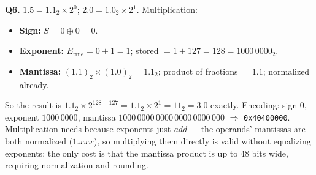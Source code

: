 \documentclass[11pt]{article}
\begin{document}
\textbf{Q6.} $1.5 = 1.1_2 \times 2^0$; $2.0 = 1.0_2 \times 2^1$. Multiplication:
\begin{itemize}
  \item \textbf{Sign:} $S = 0 \oplus 0 = 0$.
  \item \textbf{Exponent:} $E_{\text{true}} = 0 + 1 = 1$; stored $= 1 + 127 = 128 = 1000\,0000_2$.
  \item \textbf{Mantissa:} $(1.1)_2 \times (1.0)_2 = 1.1_2$; product of fractions $= 1.1$; normalized already.
\end{itemize}
So the result is $1.1_2 \times 2^{128-127} = 1.1_2 \times 2^1 = 11_2 = 3.0$ exactly. Encoding: sign 0, exponent $1000\,0000$, mantissa $1000\,0000\,0000\,0000\,0000\,000$ $\Rightarrow$ \texttt{0x40400000}. Multiplication needs  because exponents just \emph{add} --- the operands' mantissas are both normalized ($1.xxx$), so multiplying them directly is valid without equalizing exponents; the only cost is that the mantissa product is up to 48 bits wide, requiring normalization and rounding.
\end{document}
